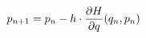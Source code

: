 \documentclass[preview]{standalone}
\begin{document}
\begin{align*}
\special{dvisvgm:raw <g id='unique000'>}p_{n+1} &= p_n - h \cdot \frac{\partial H}{\partial q}(q_n, p_n)\special{dvisvgm:raw </g>}
\end{align*}
\end{document}
